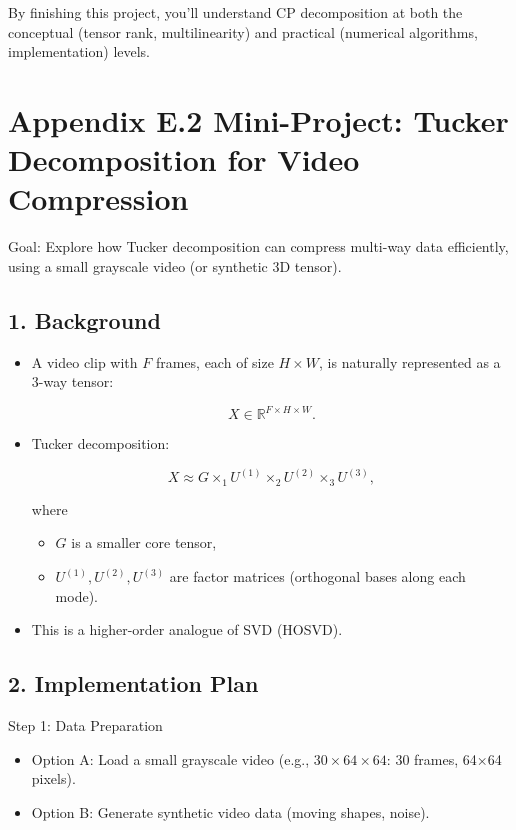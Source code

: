 \documentclass[
  letterpaper,
  DIV=11,
  numbers=noendperiod]{scrreprt}
\providecommand{\tightlist}{%
  \setlength{\itemsep}{0pt}\setlength{\parskip}{0pt}}
\begin{document}
By finishing this project, you'll understand CP decomposition at both
the conceptual (tensor rank, multilinearity) and practical (numerical
algorithms, implementation) levels.

\section{Appendix E.2 Mini-Project: Tucker Decomposition for Video
Compression}\label{appendix-e.2-mini-project-tucker-decomposition-for-video-compression}

Goal: Explore how Tucker decomposition can compress multi-way data
efficiently, using a small grayscale video (or synthetic 3D tensor).

\subsection{1. Background}\label{background-1}

\begin{itemize}
\item
  A video clip with \(F\) frames, each of size \(H \times W\), is
  naturally represented as a 3-way tensor:

  \[
  X \in \mathbb{R}^{F \times H \times W}.
  \]
\item
  Tucker decomposition:

  \[
  X \approx G \times_1 U^{(1)} \times_2 U^{(2)} \times_3 U^{(3)},
  \]

  where

  \begin{itemize}
  \tightlist
  \item
    \(G\) is a smaller core tensor,
  \item
    \(U^{(1)}, U^{(2)}, U^{(3)}\) are factor matrices (orthogonal bases
    along each mode).
  \end{itemize}
\item
  This is a higher-order analogue of SVD (HOSVD).
\end{itemize}

\subsection{2. Implementation Plan}\label{implementation-plan-1}

Step 1: Data Preparation

\begin{itemize}
\tightlist
\item
  Option A: Load a small grayscale video (e.g.,
  \(30 \times 64 \times 64\): 30 frames, 64×64 pixels).
\item
  Option B: Generate synthetic video data (moving shapes, noise).
\end{itemize}
\end{document}
